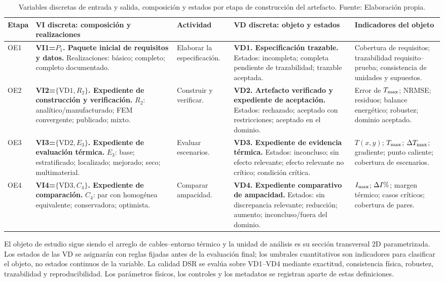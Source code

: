 \begin{table}[H]
\centering
\caption{Variables discretas de entrada y salida, composición y estados por etapa de construcción del artefacto. Fuente: Elaboración propia.}
\label{tab:dimensiones-operativas}
\begingroup
\scriptsize
\setlength{\tabcolsep}{3pt}
\renewcommand{\arraystretch}{1.42}
\begin{tabularx}{\textwidth}{L{1.10cm}L{4.25cm}L{2.15cm}L{4.25cm}Y}
\toprule
\textbf{Etapa} & \textbf{VI discreta: composición y realizaciones} & \textbf{Actividad} & \textbf{VD discreta: objeto y estados} & \textbf{Indicadores del objeto} \\
\midrule
OE1 & \textbf{VI1=$P_1$. Paquete inicial de requisitos y datos.} Realizaciones: básico; completo; completo documentado. & Elaborar la especificación. & \textbf{VD1. Especificación trazable.} Estados: incompleta; completa pendiente de trazabilidad; trazable aceptada. & Cobertura de requisitos; trazabilidad requisito--prueba; consistencia de unidades y supuestos. \\
OE2 & \textbf{VI2=$\{\mathrm{VD1},R_2\}$. Expediente de construcción y verificación.} $R_2$: analítico/manufacturado; FEM convergente; publicado; mixto. & Construir y verificar. & \textbf{VD2. Artefacto verificado y expediente de aceptación.} Estados: rechazado; aceptado con restricciones; aceptado en el dominio. & Error de $T_{\max}$; NRMSE; residuos; balance energético; robustez; dominio aceptado. \\
OE3 & \textbf{VI3=$\{\mathrm{VD2},E_3\}$. Expediente de evaluación térmica.} $E_3$: base; estratificado; localizado; mejorado; seco; multimaterial. & Evaluar escenarios. & \textbf{VD3. Expediente de evidencia térmica.} Estados: inconcluso; sin efecto relevante; efecto relevante no crítico; condición crítica. & $T(x,y)$; $T_{\max}$; $\Delta T_{\max}$; gradiente; punto caliente; cobertura de escenarios. \\
OE4 & \textbf{VI4=$\{\mathrm{VD3},C_4\}$. Expediente de comparación.} $C_4$: par con homogénea equivalente; conservadora; optimista. & Comparar ampacidad. & \textbf{VD4. Expediente comparativo de ampacidad.} Estados: sin discrepancia relevante; reducción; aumento; inconcluso/fuera del dominio. & $I_{\max}$; $\Delta I\pct$; margen térmico; casos críticos; cobertura de pares. \\
\bottomrule
\end{tabularx}
\endgroup
\end{table}

El objeto de estudio sigue siendo el arreglo de cables--entorno térmico y la unidad de análisis es su sección transversal 2D parametrizada. Los estados de las VD se asignarán con reglas fijadas antes de la evaluación final; los umbrales cuantitativos son indicadores para clasificar el objeto, no estados continuos de la variable. La calidad DSR se evalúa sobre VD1--VD4 mediante exactitud, consistencia física, robustez, trazabilidad y reproducibilidad. Los parámetros físicos, los controles y los metadatos se registran aparte de estas definiciones.


